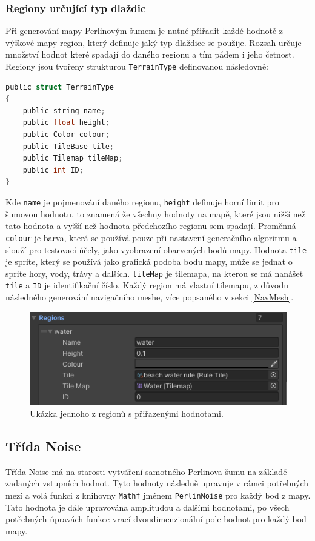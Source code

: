\subsubsection{Regiony určující typ dlaždic}
Při generování mapy Perlinovým šumem je nutné přiřadit každé hodnotě z výškové mapy region, který definuje jaký typ dlaždice se použije. Rozsah určuje množství hodnot které spadají do daného regionu a tím pádem i jeho četnost. Regiony jsou tvořeny strukturou \texttt{TerrainType} definovanou následovně:
\begin{lstlisting}[language=C]
public struct TerrainType
{
	public string name;
	public float height;
	public Color colour;
	public TileBase tile;
	public Tilemap tileMap;
	public int ID;
}
\end{lstlisting}
Kde \texttt{name} je pojmenování daného regionu, \texttt{height} definuje horní limit pro šumovou hodnotu, to znamená že všechny hodnoty na mapě, které jsou nižší než tato hodnota a vyšší než hodnota předchozího regionu sem spadají. Proměnná \texttt{colour} je barva, která se používá pouze při nastavení generačního algoritmu a slouží pro testovací účely, jako vyobrazení obarvených bodů mapy. Hodnota \texttt{tile} je sprite, který se používá jako grafická podoba bodu mapy, může se jednat o sprite hory, vody, trávy a dalších. \texttt{tileMap} je tilemapa, na kterou se má nanášet \texttt{tile} a \texttt{ID} je identifikační číslo. Každý region má vlastní tilemapu, z důvodu následného generování navigačního meshe, více popsaného v sekci \ref{NavMesh}.

\begin{figure}[H]
	\centering
	\includegraphics[scale=1]{obrazky-figures/MapGeneratorRegions.png}
	\caption{Ukázka jednoho z regionů s přiřazenými hodnotami.}
	\label{fig:MapGeneratorRegions}
\end{figure}
 
\subsection{Třída Noise}
\label{noiseClass}
Třída Noise má na starosti vytváření samotného Perlinova šumu na základě zadaných vstupních hodnot. Tyto hodnoty následně upravuje v rámci potřebných mezí a volá funkci z knihovny \texttt{Mathf} jménem \texttt{PerlinNoise} pro každý bod z mapy. Tato hodnota je dále upravována amplitudou a dalšími hodnotami, po všech potřebných úpravách funkce vrací dvoudimenzionální pole hodnot pro každý bod mapy.


